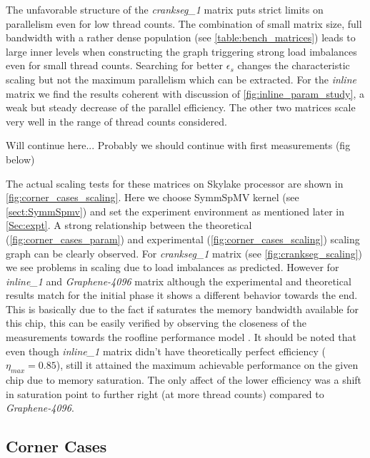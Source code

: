 The unfavorable structure of the \emph{crankseg\_1} matrix puts strict limits on parallelism even for low thread counts.  The combination of small matrix size, full bandwidth with a rather dense population (see \cref{table:bench_matrices}) leads to large inner levels when constructing the graph triggering strong load imbalances even for small thread counts. Searching for better $\epsilon_s$ changes the characteristic scaling but not the maximum parallelism which can be extracted. For the \emph{inline} matrix we find the results coherent with discussion of \cref{fig:inline_param_study}, a weak but steady decrease of the parallel efficiency. The other two matrices scale very well in the range of thread counts considered. 

{\GW Will continue here...}
{\GW Probably we should continue with first measurements (fig below)}

The actual scaling tests for these matrices on Skylake processor are shown in \cref{fig:corner_cases_scaling}. Here we choose \acrshort{SymmSpMV} kernel (see \cref{sect:SymmSpmv}) and set the experiment environment as mentioned later in \cref{Sec:expt}. A strong relationship between the theoretical  (\cref{fig:corner_cases_param}) and  experimental (\cref{fig:corner_cases_scaling}) scaling graph can be clearly observed. For \emph{crankseg\_1} matrix (see \cref{fig:crankseg_scaling}) we see problems in scaling due to load imbalances as predicted. However for \emph{inline\_1} and \emph{Graphene-4096} matrix although the experimental and theoretical results match for the initial phase it shows a different behavior towards the end. This is basically due to the fact if saturates the memory bandwidth available for this chip, this can be easily verified by observing the closeness of the measurements towards the roofline performance model . It should be noted that even though \emph{inline\_1} matrix didn't have theoretically perfect efficiency ($\eta_{max} = 0.85$), still it attained the maximum achievable performance on the given chip due to memory saturation. The only affect of the lower efficiency was a shift in saturation point to further right (at more thread counts) compared to \emph{Graphene-4096}.


\subsection{Corner Cases}



